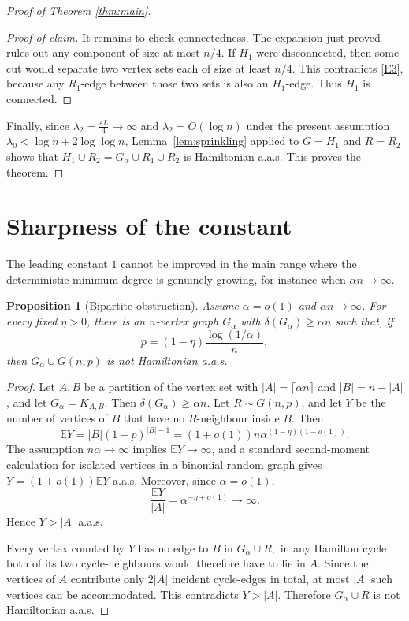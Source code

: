\documentclass[11pt,reqno]{amsart}
\newenvironment{poc}{\begin{proof}[Proof of claim]\renewcommand*{\qedsymbol}{$\blacksquare$}}{\end{proof}}
\newtheorem{proposition}[theorem]{Proposition}
\theoremstyle{definition}
\theoremstyle{remark}
\renewcommand\ge{\geqslant}
\begin{document}
\begin{proof}[Proof of Theorem \ref{thm:main}]
\begin{poc}
It remains to check connectedness. The expansion just proved rules out any component of size at most $n/4$. If $H_{1}$ were disconnected, then some cut would separate two vertex sets each of size at least $n/4$. This contradicts \ref{E3}, because any $R_{1}$-edge between those two sets is also an $H_{1}$-edge. Thus $H_{1}$ is connected.
\end{poc}



Finally, since $\lambda_{2}=\frac{\varepsilon L}{4}\rightarrow\infty$ and $\lambda_{2}=O(\log n)$ under the present assumption $\lambda_{0}<\log n+2 \log \log n$, Lemma~\ref{lem:sprinkling} applied to $G=H_{1}$ and $R=R_{2}$ shows that $H_{1}\cup R_{2}=G_\alpha\cup R_{1}\cup R_{2}$ is Hamiltonian a.a.s. This proves the theorem.
\end{proof}


\medskip

\section{Sharpness of the constant}\label{sec:sharpness}
The leading constant $1$ cannot be improved in the main range where the deterministic minimum degree is genuinely growing, for instance when $\alpha n\rightarrow\infty$.

\begin{proposition}[Bipartite obstruction]
Assume $\alpha=o(1)$ and $\alpha n\rightarrow\infty$. For every fixed $\eta>0$, there is an $n$-vertex graph $G_\alpha$ with $\delta(G_\alpha)\ge\alpha n$ such that, if
$$p=(1-\eta)\frac{\log(1/\alpha)}{n},$$
then $G_\alpha\cup G(n,p)$ is not Hamiltonian a.a.s.
\end{proposition}

\begin{proof}
Let $A, B$ be a partition of the vertex set with $|A|=\lceil\alpha n\rceil$ and $|B|=n-|A|$, and let $G_\alpha=K_{A,B}$. Then $\delta(G_\alpha)\ge\alpha n$. Let $R\sim G(n,p)$, and let $Y$ be the number of vertices of $B$ that have no $R$-neighbour inside $B$. Then
$$\mathbb{E}Y=|B|(1-p)^{|B|-1}=(1+o(1))n\alpha^{(1-\eta)(1-o(1))}.$$
The assumption $n\alpha\rightarrow\infty$ implies $\mathbb{E}Y\rightarrow\infty$, and a standard second-moment calculation for isolated vertices in a binomial random graph gives $Y=(1+o(1))\mathbb{E}Y$ a.a.s. Moreover, since $\alpha=o(1)$,
$$\frac{\mathbb{E}Y}{|A|}=\alpha^{-\eta+o(1)}\rightarrow\infty.$$
Hence $Y>|A|$ a.a.s. 

Every vertex counted by $Y$ has no edge to $B$ in $G_\alpha\cup R;$ in any Hamilton cycle both of its two cycle-neighbours would therefore have to lie in $A$. Since the vertices of $A$ contribute only $2|A|$ incident cycle-edges in total, at most $|A|$ such vertices can be accommodated. This contradicts $Y>|A|$. Therefore $G_\alpha\cup R$ is not Hamiltonian a.a.s.
\end{proof}
\end{document}
